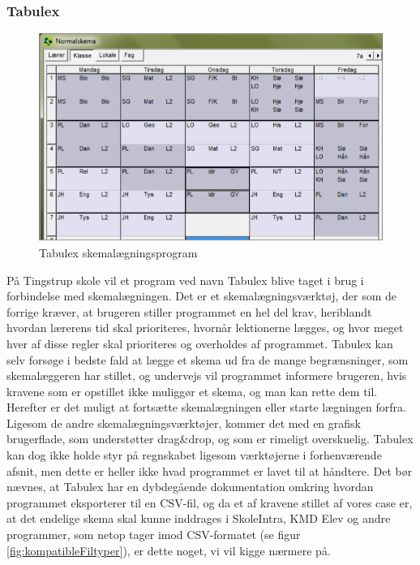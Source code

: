 \subsubsection{Tabulex}
\begin{figure}[h!]
	\centering
	\includegraphics[width=1.0\textwidth]{../Billeder/TabulexPicture.png}
	\caption{Tabulex skemalægningsprogram\cite{Tabulex}}
	\label{fig:TabulexPicture}
\end{figure}
\FloatBarrier
På Tingstrup skole vil et program ved navn Tabulex blive taget i brug i forbindelse med skemalægningen. Det er et skemalægningsværktøj, der som de forrige kræver, at brugeren stiller programmet en hel del krav, heriblandt hvordan lærerens tid skal prioriteres, hvornår lektionerne lægges, og hvor meget hver af disse regler skal prioriteres og overholdes af programmet\cite{Tabulex}. Tabulex kan selv forsøge i bedste fald at lægge et skema ud fra de mange begrænsninger, som skemalæggeren har stillet, og undervejs vil programmet informere brugeren, hvis kravene som er opstillet ikke muliggør et skema, og man kan rette dem til. Herefter er det  muligt at fortsætte skemalægningen eller starte lægningen forfra. Ligesom de andre skemalægningsværktøjer, kommer det med en grafisk brugerflade, som understøtter drag\&drop, og som er rimeligt overskuelig. Tabulex kan dog ikke holde styr på regnskabet ligesom værktøjerne i forhenværende afsnit, men dette er heller ikke hvad programmet er lavet til at håndtere. Det bør nævnes, at Tabulex har en dybdegående dokumentation omkring hvordan programmet eksporterer til en CSV-fil\cite{Tabulex_csv}, og da et af kravene stillet af vores case er, at det endelige skema skal kunne inddrages i SkoleIntra, KMD Elev og andre programmer\cite{interview_Kaerby}, som netop tager imod CSV-formatet (se figur \ref{fig:kompatibleFiltyper}), er dette noget, vi vil kigge nærmere på.
